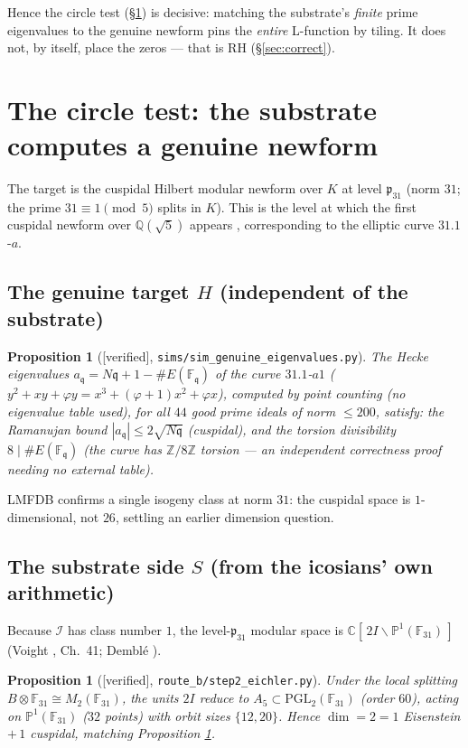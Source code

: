 \documentclass[11pt,a4paper]{article}
\newtheorem{proposition}[theorem]{Proposition}
\theoremstyle{definition}
\newcommand{\Q}{\mathbb{Q}}
\newcommand{\Z}{\mathbb{Z}}
\newcommand{\C}{\mathbb{C}}
\newcommand{\F}{\mathbb{F}}
\newcommand{\TAGver}{{\small\textsf{[\textcolor{blue!60!black}{verified}]}}}
\begin{document}
Hence the circle test (\S\ref{sec:circle}) is decisive: matching the
substrate's \emph{finite} prime eigenvalues to the genuine newform pins the
\emph{entire} L-function by tiling. It does not, by itself, place the zeros ---
that is RH (\S\ref{sec:correct}).

\section{The circle test: the substrate computes a genuine newform}\label{sec:circle}

The target is the cuspidal Hilbert modular newform over $K$ at level
$\mathfrak{p}_{31}$ (norm $31$; the prime $31\equiv1\!\pmod5$ splits in $K$).
This is the level at which the first cuspidal newform over $\Q(\sqrt5)$
appears \cite{Dembele}, corresponding to the elliptic curve $31.1$-$a$.

\subsection{The genuine target $H$ (independent of the substrate)}
\begin{proposition}[\TAGver, \texttt{sims/sim\_genuine\_eigenvalues.py}]
\label{prop:target}
The Hecke eigenvalues $a_\mathfrak{q}=N\mathfrak{q}+1-\#E(\F_\mathfrak{q})$ of
the curve $31.1$-$a1$ ($y^2+xy+\varphi y=x^3+(\varphi+1)x^2+\varphi x$),
computed by point counting (no eigenvalue table used), for all $44$ good
prime ideals of norm $\le200$, satisfy:
the Ramanujan bound $|a_\mathfrak{q}|\le 2\sqrt{N\mathfrak{q}}$ (cuspidal),
and the torsion divisibility $8\mid \#E(\F_\mathfrak{q})$ (the curve has
$\Z/8\Z$ torsion --- an independent correctness proof needing no external
table).
\end{proposition}

LMFDB confirms a single isogeny class at norm $31$: the cuspidal space is
$1$-dimensional, not $26$, settling an earlier dimension question.

\subsection{The substrate side $S$ (from the icosians' own arithmetic)}
Because $\mathcal{I}$ has class number $1$, the level-$\mathfrak{p}_{31}$
modular space is $\C[\,2I\backslash \mathbb{P}^1(\F_{31})\,]$ (Voight
\cite{Voight}, Ch.\ 41; Dembl\'e \cite{Dembele}).

\begin{proposition}[\TAGver, \texttt{route\_b/step2\_eichler.py}]
Under the local splitting $B\otimes\F_{31}\cong M_2(\F_{31})$, the units $2I$
reduce to $A_5\subset\mathrm{PGL}_2(\F_{31})$ (order $60$), acting on
$\mathbb{P}^1(\F_{31})$ ($32$ points) with orbit sizes $\{12,20\}$. Hence
$\dim = 2 = 1$ Eisenstein $+\,1$ cuspidal, matching Proposition
\ref{prop:target}.
\end{proposition}
\end{document}
